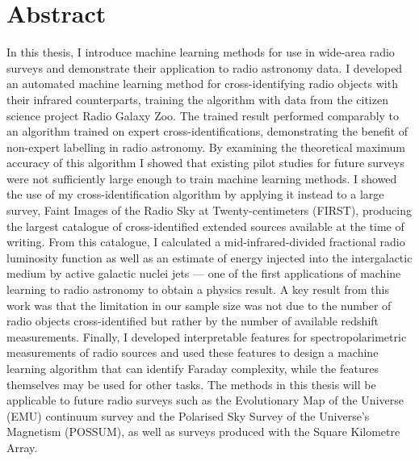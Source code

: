 \chapter*{Abstract}
\vspace{-1em}

In this thesis, I introduce machine learning methods for use in wide-area radio surveys and demonstrate their application to radio astronomy data. I developed an automated machine learning method for cross-identifying radio objects with their infrared counterparts, training the algorithm with data from the citizen science project Radio Galaxy Zoo. The trained result performed comparably to an algorithm trained on expert cross-identifications, demonstrating the benefit of non-expert labelling in radio astronomy. By examining the theoretical maximum accuracy of this algorithm I showed that existing pilot studies for future surveys were not sufficiently large enough to train machine learning methods. I showed the use of my cross-identification algorithm by applying it instead to a large survey, Faint Images of the Radio Sky at Twenty-centimeters (FIRST), producing the largest catalogue of cross-identified extended sources available at the time of writing. From this catalogue, I calculated a mid-infrared-divided fractional radio luminosity function as well as an estimate of energy injected into the intergalactic medium by active galactic nuclei jets --- one of the first applications of machine learning to radio astronomy to obtain a physics result. A key result from this work was that the limitation in our sample size was not due to the number of radio objects cross-identified but rather by the number of available redshift measurements. Finally, I developed interpretable features for spectropolarimetric measurements of radio sources and used these features to design a machine learning algorithm that can identify Faraday complexity, while the features themselves may be used for other tasks. The methods in this thesis will be applicable to future radio surveys such as the Evolutionary Map of the Universe (EMU) continuum survey and the Polarised Sky Survey of the Universe's Magnetism (POSSUM), as well as surveys produced with the Square Kilometre Array.

